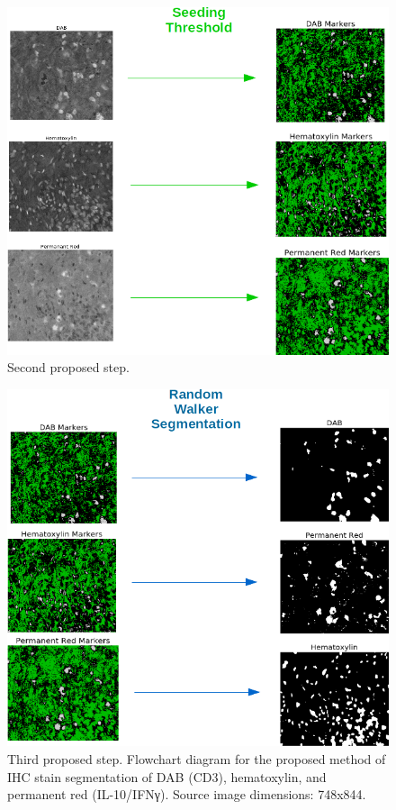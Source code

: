 \documentclass[12pt]{article}
\begin{document}
\begin{figure}[H]
  \includegraphics[width=\linewidth]{SeedThreshold7.png}
  \caption{Second proposed step.}
  \label{fig:SeedThreshold7}
\end{figure}

\begin{figure}[H]
  \includegraphics[width=\linewidth]{RandomWalkSeg8.png}
  \caption{Third proposed step.
  Flowchart diagram for the proposed method of IHC stain segmentation of DAB (CD3), hematoxylin, and permanent red (IL-10/IFNγ). Source image dimensions: 748x844.}
  \label{fig:RandomWalkSeg8}
\end{figure}
\end{document}
